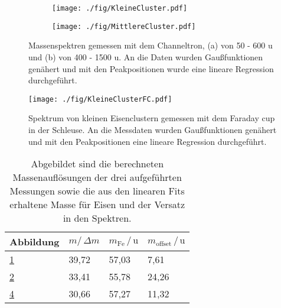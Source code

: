 \begin{figure}
  \begin{subfigure}[h]{0.9\textwidth}
    \texttt{[image: ./fig/KleineCluster.pdf]}
    \caption{}
    \label{fig:cluster_small}
  \end{subfigure}\hfill
  \begin{subfigure}[t]{1\textwidth}
    \texttt{[image: ./fig/MittlereCluster.pdf]}
    \caption{}
    \label{fig:cluster_medium}
  \end{subfigure}
  \caption{Massenspektren gemessen mit dem Channeltron, (a) von 50 - 600 u und (b) von 400 - 1500 u. An die Daten wurden Gaußfunktionen genähert und mit den Peakpositionen wurde eine lineare Regression durchgeführt.}
  \label{fig:cluster_chtr}
\end{figure}

\begin{figure}
  \centering
  \texttt{[image: ./fig/KleineClusterFC.pdf]}
  \caption{Spektrum von kleinen Eisenclustern gemessen mit dem Faraday cup in der Schleuse. An die Messdaten wurden Gaußfunktionen genähert und mit den Peakpositionen eine lineare Regression durchgeführt.}
  \label{fig:cluster_fc}
\end{figure}

\begin{table}
  \centering
  \caption{Abgebildet sind die berechneten Massenauflösungen der drei aufgeführten Messungen sowie die aus den linearen Fits erhaltene Masse für Eisen und der Versatz in den Spektren.}
  \label{tab:msfitdata}
  \begin{tabular}{llll}
      \toprule
      Abbildung	&	$m/\,\Delta m $	&	$m_\text{Fe}\,/\,\text{u}$	&	$m_\text{offset}\,/\,\text{u}$	\\
      \midrule
      \ref{fig:cluster_small}	&	39,72	&	57,03	&	7,61	\\
      \ref{fig:cluster_medium}	&	33,41	&	55,78	&	24,26	\\
      \ref{fig:cluster_fc}	&	30,66	&	57,27	&	11,32	\\
      \bottomrule
  \end{tabular}
\end{table}

